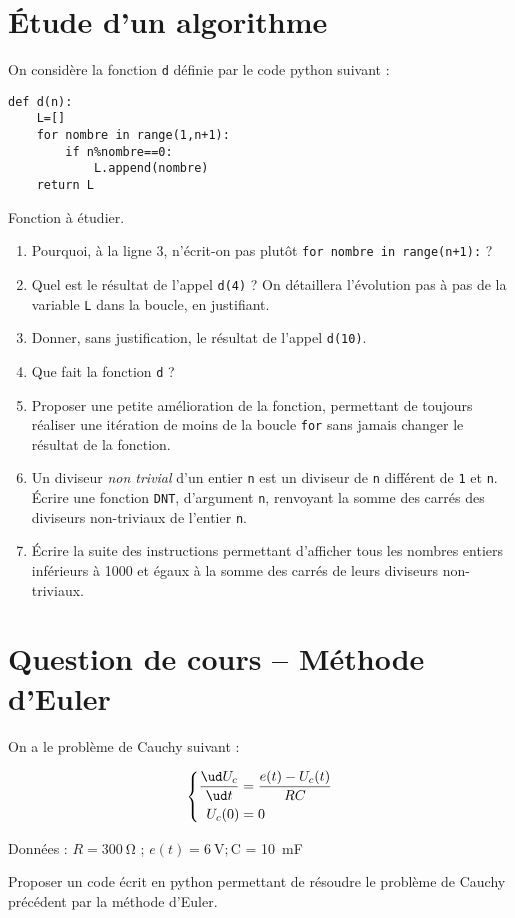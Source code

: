\section{Étude d'un algorithme}

On considère la fonction \texttt{d} définie par le code python suivant :

\begin{listing}
\begin{verbatim}
def d(n):
    L=[]
    for nombre in range(1,n+1):
        if n%nombre==0:
            L.append(nombre)
    return L
\end{verbatim}
\caption{Fonction à étudier.}
\label{prog:fonctiond}
\end{listing}

\begin{enumerate}
 \item Pourquoi, à la ligne 3, n'écrit-on pas plutôt \texttt{for nombre in range(n+1):} ?
 \item Quel est le résultat de l'appel \texttt{d(4)} ? On détaillera l'évolution pas à pas de la variable \texttt{L} dans la boucle, en justifiant.
 \item Donner, sans justification, le résultat de l'appel \texttt{d(10)}.
 \item Que fait la fonction \texttt{d} ?
 \item Proposer une petite amélioration de la fonction, permettant de toujours réaliser une itération de moins de la boucle \texttt{for} sans jamais changer le résultat de la fonction.
 \item Un diviseur \textit{non trivial} d'un entier \texttt{n} est un diviseur de \texttt{n} différent de \texttt{1} et \texttt{n}. Écrire une fonction \texttt{DNT}, d'argument \texttt{n}, renvoyant la somme des carrés des diviseurs non-triviaux de l'entier \texttt{n}.
 \item Écrire la suite des instructions permettant d'afficher tous les nombres entiers inférieurs à 1000 et égaux à la somme des carrés de leurs diviseurs non-triviaux.
\end{enumerate}

\section{Question de cours -- Méthode d'Euler}

On a le problème de Cauchy suivant :

\begin{equation*}
\left\{\begin{aligned}
\frac{\ud U_c}{\ud t} &= \frac{e(t)-U_c(t)}{RC}\\
U_c(0) &= 0
\end{aligned}
\right.
\end{equation*}

Données : $R = \SI{300}{\ohm}$ ; $e(t) = \SI{6}{\volt} ; $C = \SI{10}{\milli\farad}

Proposer un code écrit en python permettant de résoudre le problème de Cauchy précédent par la méthode d'Euler.



